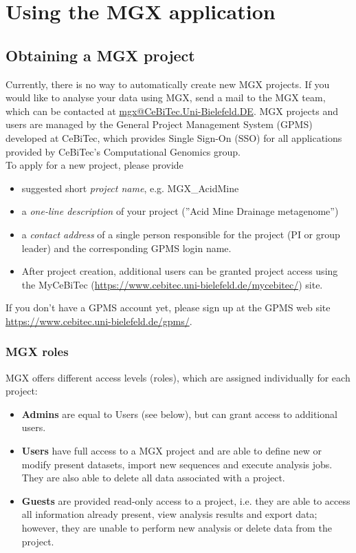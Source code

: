 
\chapter{Using the MGX application}
\label{using}


\section{Obtaining a MGX project}

Currently, there is no way to automatically create new MGX projects. If you would like to
analyse your data using MGX, send a mail to the MGX team, which can be contacted at 
\href{mailto:mgx@CeBiTec.Uni-Bielefeld.DE}{mgx@CeBiTec.Uni-Bielefeld.DE}. MGX projects
and users are managed by the General Project Management System (GPMS) developed at CeBiTec,
which provides Single Sign-On (SSO) for all applications provided by CeBiTec's Computational
Genomics group.\\

To apply for a new project, please provide

\begin{itemize}
  \item suggested short \textit{project name}, e.g. MGX\_AcidMine
  \item a \textit{one-line description} of your project (''Acid Mine Drainage metagenome'')
  \item a \textit{contact address} of a single person responsible for the project (PI or group leader)
and the corresponding GPMS login name.
  \item After project creation, additional users can be granted project access using 
the MyCeBiTec (\url{https://www.cebitec.uni-bielefeld.de/mycebitec/}) site.
\end{itemize}

If you don't have a GPMS account yet, please sign up at the GPMS web site \url{https://www.cebitec.uni-bielefeld.de/gpms/}.

\subsection{MGX roles}

MGX offers different access levels (roles), which are assigned individually for each
project: \\

\begin{itemize}
  \item{\textbf{Admins} are equal to Users (see below), but can grant access to additional users.}
  \item \textbf{Users} have full access to a MGX project and are able to define new or modify
present datasets, import new sequences and execute analysis jobs. They are also able to
delete all data associated with a project.
  \item \textbf{Guests} are provided read-only access to a project, i.e. they are able to access
all information already present, view analysis results and export data; however, they are
unable to perform new analysis or delete data from the project.
\end{itemize}

